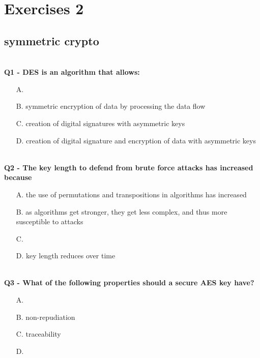 \chapter{Exercises 2}

\section{symmetric crypto}

\textbf{\\Q1 - DES is an algorithm that allows:}
\begin{enumerate}
    \item[A.] 
    \item[B.] symmetric encryption of data by processing the data flow
    \item[C.] creation of digital signatures with asymmetric keys
    \item[D.] creation of digital signature and encryption of data with asymmetric keys
\end{enumerate}

\textbf{\\Q2 - The key length to defend from brute force attacks has increased because}
\begin{enumerate}
    \item[A.] the use of permutations and transpositions in algorithms has increased
    \item[B.] as algorithms get stronger, they get less complex, and thus more susceptible to attacks
    \item[C.] 
    \item[D.] key length reduces over time
\end{enumerate}

\textbf{\\Q3 - What of the following properties should a secure AES key have?}
\begin{enumerate}
    \item[A.] 
    \item[B.] non-repudiation
    \item[C.] traceability
    \item[D.] 
\end{enumerate}

